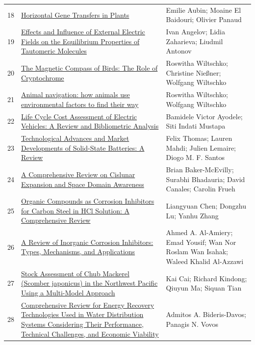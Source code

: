 \documentclass[11pt]{article}
\begin{document}
\begin{longtable}{cp{8cm}p{5cm}}
  18 & \href{https://www.mdpi.com/2075-1729/11/8/857}{Horizontal Gene Transfers in Plants} & Emilie Aubin; Moaine El Baidouri; Olivier Panaud \\
  19 & \href{https://www.mdpi.com/1420-3049/28/2/695}{Effects and Influence of External Electric Fields on the Equilibrium Properties of Tautomeric Molecules} & Ivan Angelov; Lidia Zaharieva; Liudmil Antonov \\
  20 & \href{https://www.frontiersin.org/journals/physiology/articles/10.3389/fphys.2021.667000/full}{The Magnetic Compass of Birds: The Role of Cryptochrome} & Roswitha Wiltschko; Christine Nießner; Wolfgang Wiltschko \\
  21 & \href{https://link.springer.com/article/10.1140/epjs/s11734-022-00610-w}{Animal navigation: how animals use environmental factors to find their way} & Roswitha Wiltschko; Wolfgang Wiltschko \\
  22 & \href{https://www.mdpi.com/2071-1050/12/6/2387}{Life Cycle Cost Assessment of Electric Vehicles: A Review and Bibliometric Analysis} & Bamidele Victor Ayodele; Siti Indati Mustapa \\
  23 & \href{https://www.mdpi.com/1996-1944/17/1/239}{Technological Advances and Market Developments of Solid-State Batteries: A Review} & Felix Thomas; Lauren Mahdi; Julien Lemaire; Diogo M. F. Santos \\
  24 & \href{https://arxiv.org/abs/2408.03261}{A Comprehensive Review on Cislunar Expansion and Space Domain Awareness} & Brian Baker-McEvilly; Surabhi Bhadauria; David Canales; Carolin Frueh \\
  25 & \href{https://www.mdpi.com/1996-1944/15/6/2023}{Organic Compounds as Corrosion Inhibitors for Carbon Steel in HCl Solution: A Comprehensive Review} & Liangyuan Chen; Dongzhu Lu; Yanhu Zhang \\
  26 & \href{https://www.researchgate.net/publication/371675999_A_Review_of_Inorganic_Corrosion_Inhibitors_Types_Mechanisms_and_Applications}{A Review of Inorganic Corrosion Inhibitors: Types, Mechanisms, and Applications} & Ahmed A. Al-Amiery; Emad Yousif; Wan Nor Roslam Wan Isahak; Waleed Khalid Al-Azzawi \\
  27 & \href{https://www.mdpi.com/2410-3888/8/2/80}{Stock Assessment of Chub Mackerel (Scomber japonicus) in the Northwest Pacific Using a Multi-Model Approach} & Kai Cai; Richard Kindong; Qiuyun Ma; Siquan Tian \\
  28 & \href{https://www.mdpi.com/2073-4441/16/15/2129}{Comprehensive Review for Energy Recovery Technologies Used in Water Distribution Systems Considering Their Performance, Technical Challenges, and Economic Viability} & Admitos A. Bideris-Davos; Panagis N. Vovos \\

\end{longtable}
\end{document}
